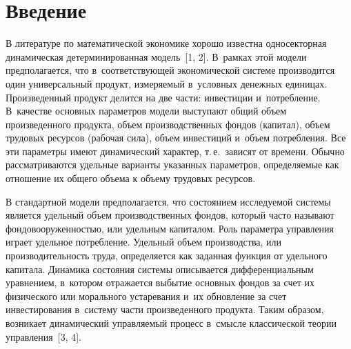   
  



\thispagestyle{headings}

\begin{multicols}{2}

\label{st\stat}

\section{Введение}

В литературе по математической экономике хорошо известна односекторная 
динамическая детерминированная модель~[1, 2]. В~рамках этой модели 
предполагается, что в~соответствующей экономической системе производится 
один универсальный продукт, из\-ме\-ря\-емый в~условных денежных единицах. 
Произведенный продукт делится на две части: инвестиции и~по\-треб\-ле\-ние. 
В~качестве основных параметров модели выступают общий объем 
произведенного продукта, объем производственных фондов (капитал), объем 
трудовых ресурсов (рабочая сила), объем инвестиций и~объем потребления. Все 
эти параметры имеют динамический характер, т.\,е.\ зависят от времени. Обычно 
рассматриваются удельные варианты указанных параметров, определяемые как 
отношение их общего объема к объему трудовых ресурсов.

     В стандартной модели предполагается, что состоянием исследуемой системы 
является удельный объем производственных фондов, который часто называют 
фондовооруженностью, или удельным капиталом. Роль параметра управления 
играет удельное по\-треб\-ле\-ние. Удельный объем производства, или 
производительность труда, определяется как заданная функция от удельного 
капитала. Динамика со\-сто\-яния сис\-те\-мы описывается дифференциальным 
уравнением, в~котором отражается выбытие основных фондов за счет их 
физического или морального устаревания и~их обновление за счет 
инвестирования в~сис\-те\-му час\-ти произведенного продукта. Таким образом, 
возникает динамический управ\-ля\-емый процесс в~смыс\-ле классической тео\-рии 
управ\-ле\-ния~[3, 4].
     

\end{multicols}
